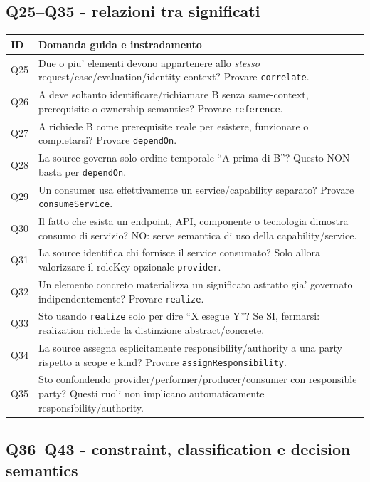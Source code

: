 \documentclass[11pt,a4paper]{article}
\begin{document}
\subsection{Q25--Q35 - relazioni tra significati}

\begin{longtable}{L{17mm}L{122mm}}
\toprule
\textbf{ID} & \textbf{Domanda guida e instradamento} \\
\midrule\endhead
Q25 & Due o piu' elementi devono appartenere allo \emph{stesso} request/case/evaluation/identity context? Provare \texttt{correlate}. \\
Q26 & A deve soltanto identificare/richiamare B senza same-context, prerequisite o ownership semantics? Provare \texttt{reference}. \\
Q27 & A richiede B come prerequisite reale per esistere, funzionare o completarsi? Provare \texttt{dependOn}. \\
Q28 & La source governa solo ordine temporale ``A prima di B''? Questo NON basta per \texttt{dependOn}. \\
Q29 & Un consumer usa effettivamente un service/capability separato? Provare \texttt{consumeService}. \\
Q30 & Il fatto che esista un endpoint, API, componente o tecnologia dimostra consumo di servizio? NO: serve semantica di uso della capability/service. \\
Q31 & La source identifica chi fornisce il service consumato? Solo allora valorizzare il roleKey opzionale \texttt{provider}. \\
Q32 & Un elemento concreto materializza un significato astratto gia' governato indipendentemente? Provare \texttt{realize}. \\
Q33 & Sto usando \texttt{realize} solo per dire ``X esegue Y''? Se SI, fermarsi: realization richiede la distinzione abstract/concrete. \\
Q34 & La source assegna esplicitamente responsibility/authority a una party rispetto a scope e kind? Provare \texttt{assignResponsibility}. \\
Q35 & Sto confondendo provider/performer/producer/consumer con responsible party? Questi ruoli non implicano automaticamente responsibility/authority. \\
\bottomrule
\end{longtable}

\subsection{Q36--Q43 - constraint, classification e decision semantics}
\end{document}
